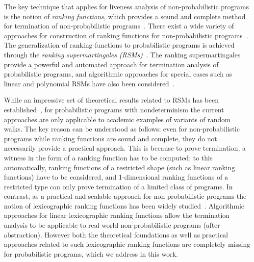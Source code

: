 \smallskip{}
The key technique that applies for liveness analysis of non-probabilistic programs is 
the notion of {\em ranking functions}, which provides a sound and complete 
method for termination of non-probabilistic programs~\cite{rwfloyd1967programs}.
There exist a wide variety of approaches for construction 
of ranking functions for non-probabilistic programs~\cite{DBLP:conf/cav/BradleyMS05,DBLP:conf/tacas/ColonS01,DBLP:conf/vmcai/PodelskiR04,DBLP:conf/pods/SohnG91}.
The generalization of ranking functions to probabilistic programs is achieved through the
{\em ranking supermartingales (RSMs)}~\cite{SriramCAV,HolgerPOPL,CF17}.
The ranking supermartingales provide a powerful and automated approach for termination 
analysis of probabilistic programs, and algorithmic approaches for special cases such as 
linear and polynomial RSMs have also been considered~\cite{SriramCAV,CFNH16:prob-termination,CFG16,CNZ17}.



\smallskip{} 
While an impressive set of theoretical results related to RSMs has been
established~\cite{SriramCAV,HolgerPOPL,CF17,CFNH16:prob-termination,CFG16,CNZ17}, 
for probabilistic programs with nondeterminism the current approaches  
are only applicable to academic examples of variants of random walks. 
The key reason can be understood as follows: even for non-probabilistic programs while 
ranking functions are sound and complete, they do not necessarily provide a practical 
approach. This is because to prove termination, a witness in the form of a 
ranking function has to be computed: to this automatically, ranking functions 
of a restricted shape (such as linear ranking functions) have to be considered, 
and 1-dimensional ranking functions of a restricted type can only prove 
termination of a limited class of programs. 
In contrast, as a practical and scalable approach for non-probabilistic programs the 
notion of lexicographic ranking functions has been widely 
studied~\cite{CSZ13,ADFG10:lexicographic,GMR15:rank-extremal,BCIKP16:T2}. 
Algorithmic approaches for linear lexicographic ranking functions allow the 
termination analysis 
to be applicable to real-world non-probabilistic programs (after abstraction).
However both the theoretical foundations as well as practical approaches related to 
such lexicographic ranking functions are completely missing for probabilistic programs,
which we address in this work.







